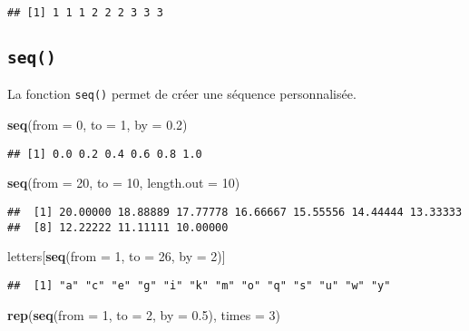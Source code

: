 \documentclass[]{book}
\newenvironment{Shaded}{\begin{snugshade}}{\end{snugshade}}
\newcommand{\KeywordTok}[1]{\textcolor[rgb]{0.13,0.29,0.53}{\textbf{#1}}}
\newcommand{\DataTypeTok}[1]{\textcolor[rgb]{0.13,0.29,0.53}{#1}}
\newcommand{\DecValTok}[1]{\textcolor[rgb]{0.00,0.00,0.81}{#1}}
\newcommand{\FloatTok}[1]{\textcolor[rgb]{0.00,0.00,0.81}{#1}}
\newcommand{\NormalTok}[1]{#1}
\theoremstyle{definition}
\theoremstyle{definition}
\theoremstyle{definition}
\theoremstyle{remark}
\begin{document}
\begin{verbatim}
## [1] 1 1 1 2 2 2 3 3 3
\end{verbatim}

\subsection{\texorpdfstring{\texttt{seq()}}{seq()}}\label{l015seq}

La fonction \texttt{seq()} permet de créer une séquence personnalisée.

\begin{Shaded}
\begin{Highlighting}[]
\KeywordTok{seq}\NormalTok{(}\DataTypeTok{from =} \DecValTok{0}\NormalTok{, }\DataTypeTok{to =} \DecValTok{1}\NormalTok{, }\DataTypeTok{by =} \FloatTok{0.2}\NormalTok{)}
\end{Highlighting}
\end{Shaded}

\begin{verbatim}
## [1] 0.0 0.2 0.4 0.6 0.8 1.0
\end{verbatim}

\begin{Shaded}
\begin{Highlighting}[]
\KeywordTok{seq}\NormalTok{(}\DataTypeTok{from =} \DecValTok{20}\NormalTok{, }\DataTypeTok{to =} \DecValTok{10}\NormalTok{, }\DataTypeTok{length.out =} \DecValTok{10}\NormalTok{)}
\end{Highlighting}
\end{Shaded}

\begin{verbatim}
##  [1] 20.00000 18.88889 17.77778 16.66667 15.55556 14.44444 13.33333
##  [8] 12.22222 11.11111 10.00000
\end{verbatim}

\begin{Shaded}
\begin{Highlighting}[]
\NormalTok{letters[}\KeywordTok{seq}\NormalTok{(}\DataTypeTok{from =} \DecValTok{1}\NormalTok{, }\DataTypeTok{to =} \DecValTok{26}\NormalTok{, }\DataTypeTok{by =} \DecValTok{2}\NormalTok{)]}
\end{Highlighting}
\end{Shaded}

\begin{verbatim}
##  [1] "a" "c" "e" "g" "i" "k" "m" "o" "q" "s" "u" "w" "y"
\end{verbatim}

\begin{Shaded}
\begin{Highlighting}[]
\KeywordTok{rep}\NormalTok{(}\KeywordTok{seq}\NormalTok{(}\DataTypeTok{from =} \DecValTok{1}\NormalTok{, }\DataTypeTok{to =} \DecValTok{2}\NormalTok{, }\DataTypeTok{by =} \FloatTok{0.5}\NormalTok{), }\DataTypeTok{times =} \DecValTok{3}\NormalTok{)}
\end{Highlighting}
\end{Shaded}
\end{document}
